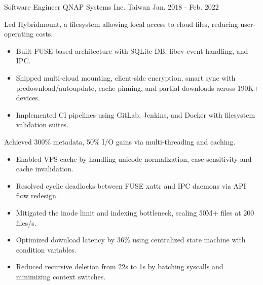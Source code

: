\begin{cventries}
  \cventry
    {Software Engineer} %
    {QNAP Systems Inc.} %
    {Taiwan} %
    {Jan. 2018 - Feb. 2022} %
    {
      \begin{cvitems} %
        \item {
          Led Hybridmount, a filesystem allowing local access to cloud
          files, reducing user-operating costs.
          }
        \begin{itemize}
          \item {
            Built FUSE-based architecture with SQLite DB, libev event handling,
            and IPC.
            }
          \item {
            Shipped multi-cloud mounting, client-side encryption, smart
            sync with predownload/autoupdate, cache pinning, and partial downloads across 190K+ devices.
            }
          \item {
            Implemented CI pipelines using GitLab, Jenkins, and Docker with
            filesystem validation suites.
            }
        \end{itemize}
        \item {
          Achieved 300\% metadata, 50\% I/O gains via multi-threading and caching.
          }
        \begin{itemize}
          \item {
            Enabled VFS cache by handling unicode normalization,
            case-sensitivity and cache invalidation.
            }
          \item {
            Resolved cyclic deadlocks between FUSE xattr and IPC daemons via API flow redesign.
            }
          \item {
            Mitigated the inode limit and indexing bottleneck, scaling 50M+ files at 200 files/s.
            }
          \item {
            Optimized download latency by 36\% using centralized state machine with condition variables.
            }
          \item {
            Reduced recursive deletion from 22s to 1s by batching syscalls and minimizing context
            switches.
            }
        \end{itemize}
      \end{cvitems}
    }

\end{cventries}

